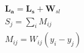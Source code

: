 \documentclass[preview]{standalone}
\begin{document}
\begin{align*}
\mathbf{ L_a } = \mathbf{L_s} + \mathbf{W}_{sl} \\  S_j  = \sum_i  M_{ij}  \\  M_{ij}  = W_{ij}(y_i - y_j)
\end{align*}
\end{document}
